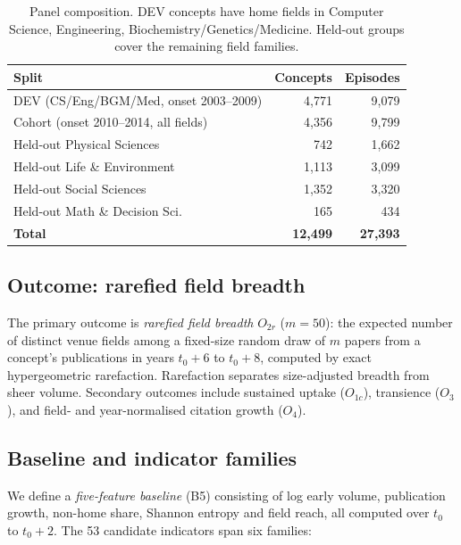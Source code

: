 \documentclass[11pt,letterpaper]{article}
\begin{document}
\begin{table}[!htbp]
\centering
\caption{Panel composition. DEV concepts have home fields in Computer Science, Engineering, Biochemistry/Genetics/Medicine. Held-out groups cover the remaining field families.}
\label{tab:panel}
\small
\begin{tabular}{lrr}
\toprule
Split & Concepts & Episodes \\
\midrule
DEV (CS/Eng/BGM/Med, onset 2003--2009) & 4{,}771 & 9{,}079 \\
Cohort (onset 2010--2014, all fields) & 4{,}356 & 9{,}799 \\
Held-out Physical Sciences & 742 & 1{,}662 \\
Held-out Life \& Environment & 1{,}113 & 3{,}099 \\
Held-out Social Sciences & 1{,}352 & 3{,}320 \\
Held-out Math \& Decision Sci. & 165 & 434 \\
\midrule
\textbf{Total} & \textbf{12{,}499} & \textbf{27{,}393} \\
\bottomrule
\end{tabular}
\end{table}

\subsection{Outcome: rarefied field breadth}

The primary outcome is \emph{rarefied field breadth} $O_{2r}$ ($m = 50$): the expected number of distinct venue fields among a fixed-size random draw of $m$ papers from a concept's publications in years $t_0 + 6$ to $t_0 + 8$, computed by exact hypergeometric rarefaction. Rarefaction separates size-adjusted breadth from sheer volume. Secondary outcomes include sustained uptake ($O_{1c}$), transience ($O_3$), and field- and year-normalised citation growth ($O_4$).

\subsection{Baseline and indicator families}
\label{sec:indicators}

We define a \emph{five-feature baseline} (B5) consisting of log early volume, publication growth, non-home share, Shannon entropy and field reach, all computed over $t_0$ to $t_0 + 2$. The 53 candidate indicators span six families:
\end{document}
